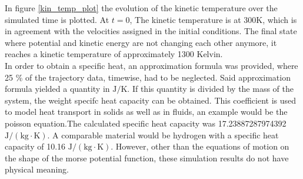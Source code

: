 In figure \ref{kin_temp_plot} the evolution of the kinetic temperature over the simulated time is plotted. At $t=0$, The kinetic temperature is at 300K, which
is in agreement with the velocities assigned in the initial conditions. The final state where potential and kinetic energy are not changing each other anymore, it reaches a
kinetic temperature of approximately 1300 Kelvin. \\

In order to obtain a specific heat, an approximation formula was provided, where 25 \% of the trajectory data, timewise, had to be neglected.
Said approximation formula yielded a quantity in $\mathrm{J} \slash \mathrm{K}$. If this quantity is divided by the mass of the system,
the weight specifc heat capacity can be obtained. This coefficient is used to model heat transport in solids as well as in fluids,
an example would be the poisson equation.The calculated specific heat capacity was 17.23887287974392 $\mathrm{J} \slash (\mathrm{kg} \cdot \mathrm{K})$. 
A comparable material would be hydrogen with a specific heat capacity of 10.16 $\mathrm{J} \slash (\mathrm{kg} \cdot \mathrm{K})$. However, other than
the equations of motion on the shape of the morse potential function, these simulation results do not have physical meaning.